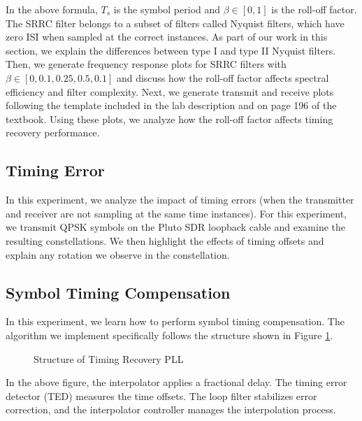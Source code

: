 \documentclass{article}
\begin{document}
\noindent In the above formula, $T_s$ is the symbol period and $\beta \in [0,1]$ is the roll-off factor. The SRRC filter belongs to a subset of filters called Nyquist filters, which have zero ISI when sampled at the correct instances. As part of our work in this section, we explain the differences between type I and type II Nyquist filters. Then, we generate frequency response plots for SRRC filters with $\beta \in [0, 0.1, 0.25, 0.5, 0.1]$ and discuss how the roll-off factor affects spectral efficiency and filter complexity. Next, we generate transmit and receive plots following the template included in the lab description and on page 196 of the textbook. Using these plots, we analyze how the roll-off factor affects timing recovery performance.

\subsection{Timing Error}

In this experiment, we analyze the impact of timing errors (when the transmitter and receiver are not sampling at the same time instances). For this experiment, we transmit QPSK symbols on the Pluto SDR loopback cable and examine the resulting constellations. We then highlight the effects of timing offsets and explain any rotation we observe in the constellation.

\subsection{Symbol Timing Compensation}

In this experiment, we learn how to perform symbol timing compensation. The algorithm we implement specifically follows the structure shown in Figure \ref{fig::timing_recovery_block_diagram}.

\begin{figure}[H]
	\centerline{}
	\caption{Structure of Timing Recovery PLL}
	\label{fig::timing_recovery_block_diagram}
\end{figure}

\noindent In the above figure, the interpolator applies a fractional delay. The timing error detector (TED) measures the time offsets. The loop filter stabilizes error correction, and the interpolator controller manages the interpolation process.
\end{document}
